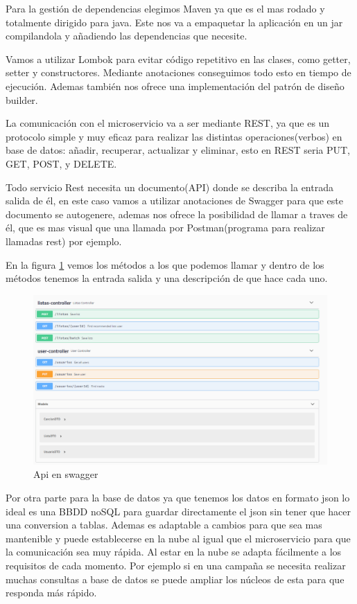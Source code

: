 \documentclass[12pt]{report} %
\begin{document}
Para la gestión de dependencias elegimos Maven ya que es el mas rodado y totalmente dirigido para java. Este nos va a empaquetar la aplicación en un jar compilandola y añadiendo las dependencias que necesite.

Vamos a utilizar Lombok para evitar código repetitivo en las clases, como getter, setter y constructores. Mediante anotaciones conseguimos todo esto en tiempo de ejecución. Ademas también nos ofrece una implementación del patrón de diseño builder.

La comunicación con el microservicio va a ser mediante REST, ya que es un protocolo simple y muy eficaz para realizar las distintas operaciones(verbos) en base de datos: añadir, recuperar, actualizar y eliminar, esto en REST seria PUT, GET, POST, y DELETE.

Todo servicio Rest necesita un documento(API) donde se describa la entrada salida de él, en este caso vamos a utilizar anotaciones de Swagger para que este documento se autogenere, ademas nos ofrece la posibilidad de llamar a traves de él, que es mas visual que una llamada por Postman(programa para realizar llamadas rest) por ejemplo.

En la figura \ref{fig:capturaswagger} vemos los métodos a los que podemos llamar y dentro de los métodos tenemos la entrada salida y una descripción de que hace cada uno.
\begin{figure}
	\centering
	\includegraphics[width=0.7\linewidth]{imagenes/CapturaSwagger}
	\caption{Api en swagger}
	\label{fig:capturaswagger}
\end{figure}


Por otra parte para la base de datos ya que tenemos los datos en formato json lo ideal es una BBDD noSQL para guardar directamente el json sin tener que hacer una conversion a tablas. Ademas es adaptable a cambios para que sea mas mantenible y puede establecerse en la nube al igual que el microservicio para que la comunicación sea muy rápida. Al estar en la nube se adapta fácilmente a los requisitos de cada momento. Por ejemplo si en una campaña se necesita realizar muchas consultas a base de datos se puede ampliar los núcleos de esta para que responda más rápido.
\end{document}
